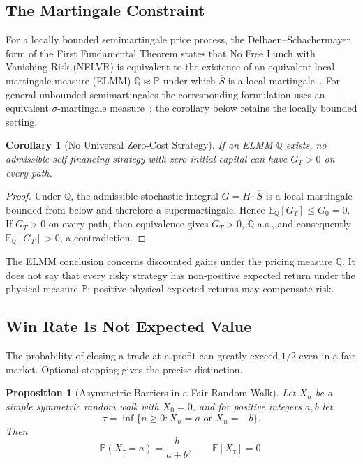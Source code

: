 \documentclass[aps,pra,reprint,superscriptaddress,amsmath,amssymb,floatfix]{revtex4-2}
\theoremstyle{plain}
\newtheorem{corollary}[theorem]{Corollary}
\newtheorem{proposition}[theorem]{Proposition}
\theoremstyle{definition}
\theoremstyle{remark}
\begin{document}
\subsection{The Martingale Constraint}

For a locally bounded semimartingale price process, the
Delbaen--Schachermayer form of the First Fundamental Theorem states that No
Free Lunch with Vanishing Risk (NFLVR) is equivalent to the existence of an
equivalent local martingale measure (ELMM)
\(\mathbb{Q}\approx\mathbb{P}\) under which \(\overline S\) is a local
martingale~\cite{Harrison1981,Delbaen1994}. For general unbounded
semimartingales the corresponding formulation uses an equivalent
\(\sigma\)-martingale measure~\cite{DelbaenSchachermayer1998}; the corollary below
retains the locally bounded setting.

\begin{corollary}[No Universal Zero-Cost Strategy]
  \label{cor:noarb}
  If an ELMM \(\mathbb{Q}\) exists, no admissible self-financing strategy with
  zero initial capital can have \(G_T>0\) on every path.
\end{corollary}

\begin{proof}
Under \(\mathbb{Q}\), the admissible stochastic integral
\(G=H\mathbin{\cdot}\overline S\) is a local martingale bounded from below and
therefore a supermartingale. Hence
\(\mathbb{E}_{\mathbb{Q}}[G_T]\leq G_0=0\). If \(G_T>0\) on every path, then
equivalence gives \(G_T>0\), \(\mathbb{Q}\)-a.s., and consequently
\(\mathbb{E}_{\mathbb{Q}}[G_T]>0\), a contradiction.
\end{proof}

The ELMM conclusion concerns discounted gains under the pricing measure
\(\mathbb{Q}\). It does not say that every risky strategy has non-positive
expected return under the physical measure \(\mathbb{P}\); positive physical
expected returns may compensate risk.

\subsection{Win Rate Is Not Expected Value}

The probability of closing a trade at a profit can greatly exceed \(1/2\)
even in a fair market. Optional stopping gives the precise distinction.

\begin{proposition}[Asymmetric Barriers in a Fair Random Walk]
  \label{prop:optional}
  Let \(X_n\) be a simple symmetric random walk with \(X_0=0\), and for positive
  integers \(a,b\) let
  \[
    \tau=\inf\{n\geq0:X_n=a\text{ or }X_n=-b\}.
  \]
  Then
  \begin{equation}
    \mathbb{P}(X_\tau=a)=\frac{b}{a+b},
    \qquad
    \mathbb{E}[X_\tau]=0.
    \label{eq:gambler}
  \end{equation}
\end{proposition}
\end{document}
